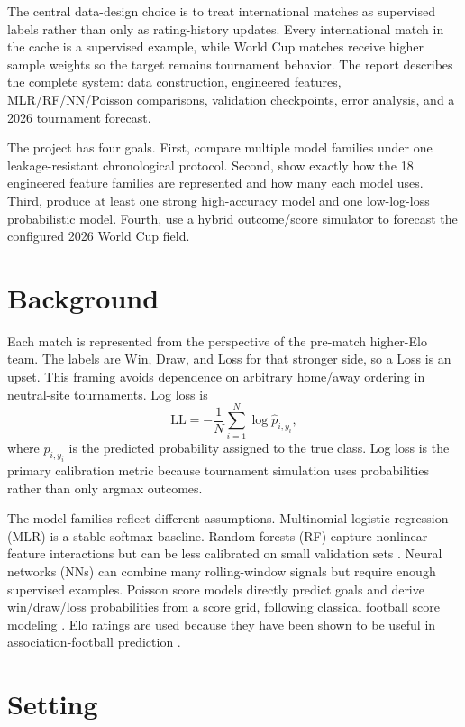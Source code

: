 \documentclass{article}
\begin{document}
The central data-design choice is to treat international matches as supervised
labels rather than only as rating-history updates. Every international match in
the cache is a supervised example, while World Cup matches receive higher
sample weights so the target remains tournament behavior. The report describes
the complete system: data construction, engineered features, MLR/RF/NN/Poisson
comparisons, validation checkpoints, error analysis, and a 2026 tournament
forecast.

The project has four goals. First, compare multiple model families under one
leakage-resistant chronological protocol. Second, show exactly how the 18
engineered feature families are represented and how many each model uses.
Third, produce at least one strong high-accuracy model and one low-log-loss
probabilistic model. Fourth, use a hybrid outcome/score simulator to forecast
the configured 2026 World Cup field.

\section{Background}

Each match is represented from the perspective of the pre-match higher-Elo
team. The labels are Win, Draw, and Loss for that stronger side, so a Loss is
an upset. This framing avoids dependence on arbitrary home/away ordering in
neutral-site tournaments. Log loss is
\[
  \mathrm{LL} = -\frac{1}{N}\sum_{i=1}^{N}\log \hat p_{i,y_i},
\]
where $\hat p_{i,y_i}$ is the predicted probability assigned to the true
class. Log loss is the primary calibration metric because tournament
simulation uses probabilities rather than only argmax outcomes.

The model families reflect different assumptions. Multinomial logistic
regression (MLR) is a stable softmax baseline. Random forests (RF) capture
nonlinear feature interactions but can be less calibrated on small validation
sets \citep{breiman2001random}. Neural networks (NNs) can combine many
rolling-window signals but require enough supervised examples. Poisson score
models directly predict goals and derive win/draw/loss probabilities from a
score grid, following classical football score modeling
\citep{maher1982modelling,dixon1997modelling}. Elo ratings are used because
they have been shown to be useful in association-football prediction
\citep{hvattum2010using}.

\section{Setting}
\end{document}
